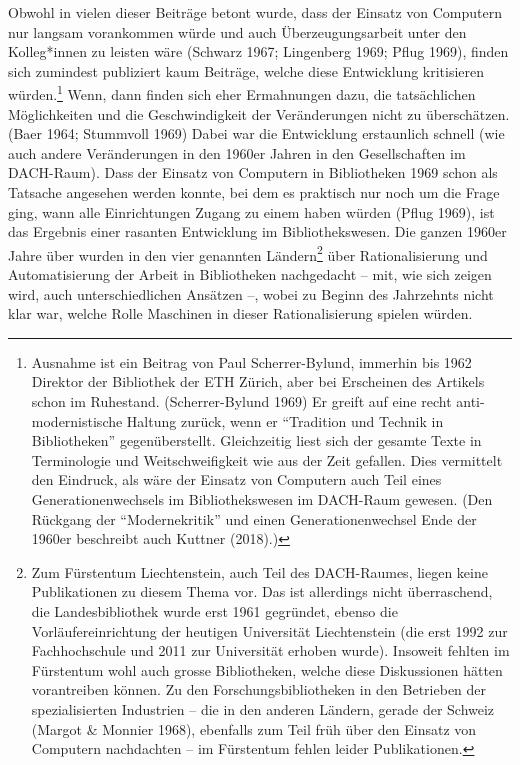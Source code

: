 \documentclass[a4paper,
fontsize=11pt,
oneside,
numbers=noperiodatend,
parskip=half-,
bibliography=totoc,
final
]{scrartcl}
\begin{document}
Obwohl in vielen dieser Beiträge betont wurde, dass der Einsatz von
Computern nur langsam vorankommen würde und auch Überzeugungsarbeit
unter den Kolleg*innen zu leisten wäre (Schwarz 1967; Lingenberg 1969;
Pflug 1969), finden sich zumindest publiziert kaum Beiträge, welche
diese Entwicklung kritisieren würden.\footnote{Ausnahme ist ein Beitrag
  von Paul Scherrer-Bylund, immerhin bis 1962 Direktor der Bibliothek
  der ETH Zürich, aber bei Erscheinen des Artikels schon im Ruhestand.
  (Scherrer-Bylund 1969) Er greift auf eine recht anti-modernistische
  Haltung zurück, wenn er \enquote{Tradition und Technik in Bibliotheken}
  gegenüberstellt. Gleichzeitig liest sich der gesamte Texte in
  Terminologie und Weitschweifigkeit wie aus der Zeit gefallen. Dies
  vermittelt den Eindruck, als wäre der Einsatz von Computern auch Teil
  eines Generationenwechsels im Bibliothekswesen im DACH-Raum gewesen.
  (Den Rückgang der \enquote{Modernekritik} und einen Generationenwechsel Ende
  der 1960er beschreibt auch Kuttner (2018).)} Wenn, dann finden sich
eher Ermahnungen dazu, die tatsächlichen Möglichkeiten und die
Geschwindigkeit der Veränderungen nicht zu überschätzen. (Baer 1964;
Stummvoll 1969) Dabei war die Entwicklung erstaunlich schnell (wie auch
andere Veränderungen in den 1960er Jahren in den Gesellschaften im
DACH-Raum). Dass der Einsatz von Computern in Bibliotheken 1969 schon
als Tatsache angesehen werden konnte, bei dem es praktisch nur noch um
die Frage ging, wann alle Einrichtungen Zugang zu einem haben würden
(Pflug 1969), ist das Ergebnis einer rasanten Entwicklung im
Bibliothekswesen. Die ganzen 1960er Jahre über wurden in den vier
genannten Ländern\footnote{Zum Fürstentum Liechtenstein, auch Teil des
  DACH-Raumes, liegen keine Publikationen zu diesem Thema vor. Das ist
  allerdings nicht überraschend, die Landesbibliothek wurde erst 1961
  gegründet, ebenso die Vorläufereinrichtung der heutigen Universität
  Liechtenstein (die erst 1992 zur Fachhochschule und 2011 zur
  Universität erhoben wurde). Insoweit fehlten im Fürstentum wohl auch
  grosse Bibliotheken, welche diese Diskussionen hätten vorantreiben
  können. Zu den Forschungsbibliotheken in den Betrieben der
  spezialisierten Industrien -- die in den anderen Ländern, gerade der
  Schweiz (Margot \& Monnier 1968), ebenfalls zum Teil früh über den
  Einsatz von Computern nachdachten -- im Fürstentum fehlen leider
  Publikationen.} über Rationalisierung und Automatisierung der Arbeit
in Bibliotheken nachgedacht -- mit, wie sich zeigen wird, auch
unterschiedlichen Ansätzen --, wobei zu Beginn des Jahrzehnts nicht klar
war, welche Rolle Maschinen in dieser Rationalisierung spielen würden.
\end{document}
